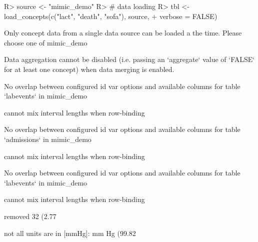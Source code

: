 \documentclass[
]{jss}
\begin{document}
\begin{CodeChunk}

\begin{CodeInput}
R> source <- "mimic_demo"
R> # data loading
R> tbl <- load_concepts(c("lact", "death", "sofa"), source,
+                      verbose = FALSE)
\end{CodeInput}

\begin{CodeOutput}
Only concept data from a single data source can be loaded a the time. Please
choose one of mimic_demo
\end{CodeOutput}

\begin{CodeOutput}
Data aggregation cannot be disabled (i.e. passing an `aggregate` value of
`FALSE` for at least one concept) when data merging is enabled.
\end{CodeOutput}

\begin{CodeOutput}
No overlap between configured id var options and available columns for table
`labevents` in mimic_demo
\end{CodeOutput}

\begin{CodeOutput}
cannot mix interval lengths when row-binding
\end{CodeOutput}

\begin{CodeOutput}
No overlap between configured id var options and available columns for table
`admissions` in mimic_demo
\end{CodeOutput}

\begin{CodeOutput}
cannot mix interval lengths when row-binding
\end{CodeOutput}

\begin{CodeOutput}
No overlap between configured id var options and available columns for table
`labevents` in mimic_demo
\end{CodeOutput}

\begin{CodeOutput}
cannot mix interval lengths when row-binding
\end{CodeOutput}

\begin{CodeOutput}
removed 32 (2.77%
\end{CodeOutput}

\begin{CodeOutput}
not all units are in [mmHg]: mm Hg (99.82%
\end{CodeOutput}


\end{CodeChunk}
\end{document}
